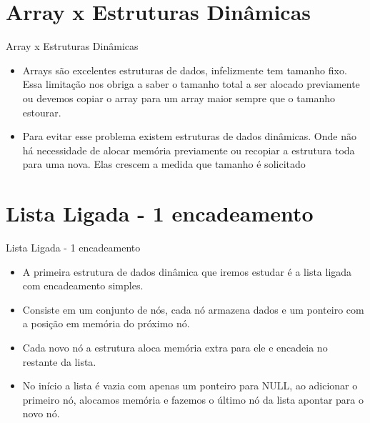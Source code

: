 \section{Array x Estruturas Dinâmicas}

\begin{frame}
	\begin{block}{Array x Estruturas Dinâmicas}
		\begin{itemize}
			\item Arrays são excelentes estruturas de dados, infelizmente tem tamanho fixo. Essa limitação nos obriga a saber o tamanho total a ser alocado previamente ou devemos copiar o array para um array maior sempre que o tamanho estourar.

			\item Para evitar esse problema existem estruturas de dados dinâmicas. Onde não há necessidade de alocar memória previamente ou recopiar a estrutura toda para uma nova. Elas crescem a medida que tamanho é solicitado
		\end{itemize}
	\end{block}
\end{frame}

\section{Lista Ligada - 1 encadeamento}
\begin{frame}
	\begin{block}{Lista Ligada - 1 encadeamento}
		\begin{itemize}
			\item A primeira estrutura de dados dinâmica que iremos estudar é a lista ligada com encadeamento simples.
	
			\item Consiste em um conjunto de nós, cada nó armazena dados e um ponteiro com a posição em memória do próximo nó.
			
			\item Cada novo nó a estrutura aloca memória extra para ele e encadeia no restante da lista.
			
			\item No início a lista é vazia com apenas um ponteiro para NULL, ao adicionar o primeiro nó, alocamos memória e fazemos o último nó da lista apontar para o novo nó.
		\end{itemize}
	\end{block}
\end{frame}

